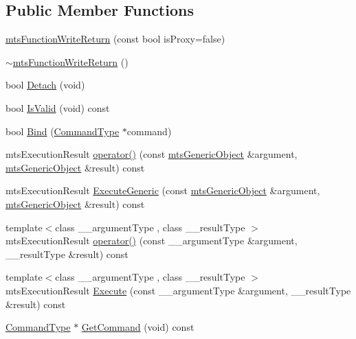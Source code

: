 \subsection*{Public Member Functions}
\begin{DoxyCompactItemize}
\item 
\hyperlink{classmts_function_write_return_a888e54e6998747c0a9d960da550d9be8}{mts\+Function\+Write\+Return} (const bool is\+Proxy=false)
\item 
\hyperlink{classmts_function_write_return_aa5acc0af80061ee2b861b90f55f5f359}{$\sim$mts\+Function\+Write\+Return} ()
\item 
bool \hyperlink{classmts_function_write_return_ae89669a12aeb0cb18ca3b7dc868f5684}{Detach} (void)
\item 
bool \hyperlink{classmts_function_write_return_acd8201536236c23b5b1a5290d801018a}{Is\+Valid} (void) const 
\item 
bool \hyperlink{classmts_function_write_return_ae25c9ce73fdb2c24d6cba15ee788e02c}{Bind} (\hyperlink{classmts_function_write_return_ac896d3571d680531a898daf398774881}{Command\+Type} $\ast$command)
\item 
mts\+Execution\+Result \hyperlink{classmts_function_write_return_ac4775bc92af01d5f4b505f17a8999c51}{operator()} (const \hyperlink{classmts_generic_object}{mts\+Generic\+Object} \&argument, \hyperlink{classmts_generic_object}{mts\+Generic\+Object} \&result) const 
\item 
mts\+Execution\+Result \hyperlink{classmts_function_write_return_af37cce99779df86483046110eb1eb79b}{Execute\+Generic} (const \hyperlink{classmts_generic_object}{mts\+Generic\+Object} \&argument, \hyperlink{classmts_generic_object}{mts\+Generic\+Object} \&result) const 
\item 
{\footnotesize template$<$class \+\_\+\+\_\+argument\+Type , class \+\_\+\+\_\+result\+Type $>$ }\\mts\+Execution\+Result \hyperlink{classmts_function_write_return_a7a80a6d3411e8e3197f91a18ee4d28bb}{operator()} (const \+\_\+\+\_\+argument\+Type \&argument, \+\_\+\+\_\+result\+Type \&result) const 
\item 
{\footnotesize template$<$class \+\_\+\+\_\+argument\+Type , class \+\_\+\+\_\+result\+Type $>$ }\\mts\+Execution\+Result \hyperlink{classmts_function_write_return_a419c077434c89d092ea58e1ff8671284}{Execute} (const \+\_\+\+\_\+argument\+Type \&argument, \+\_\+\+\_\+result\+Type \&result) const 
\item 
\hyperlink{classmts_function_write_return_ac896d3571d680531a898daf398774881}{Command\+Type} $\ast$ \hyperlink{classmts_function_write_return_a9538b7e6a7bc2656be89e70b9cc6f2f2}{Get\+Command} (void) const 

\end{DoxyCompactItemize}
